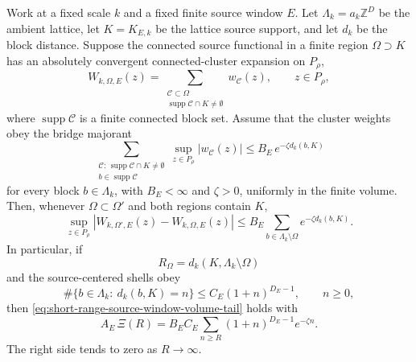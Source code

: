 \begin{lemma}
\label{lem:polymer-bridge-source-window-boundary-tail}
Work at a fixed scale \(k\) and a fixed finite source window \(E\).  Let
\(\Lambda_k=a_k\mathbb Z^D\) be the ambient lattice, let
\(K=K_{E,k}\) be the lattice source support, and let \(d_k\) be the block
distance.  Suppose the connected source functional in a finite region
\(\Omega\supset K\) has an absolutely convergent connected-cluster
expansion on \(P_\rho\),
\begin{equation}
  W_{k,\Omega,E}(z)
  =
  \sum_{\substack{\mathcal C\subset\Omega\\
    \operatorname{supp}\mathcal C\cap K\neq\emptyset}}
  w_{\mathcal C}(z),
  \qquad z\in P_\rho ,
  \label{eq:source-window-connected-cluster-expansion}
\end{equation}
where \(\operatorname{supp}\mathcal C\) is a finite connected block set.
Assume that the cluster weights obey the bridge majorant
\begin{equation}
  \sum_{\substack{\mathcal C:\,
    \operatorname{supp}\mathcal C\cap K\neq\emptyset\\
    b\in\operatorname{supp}\mathcal C}}
  \sup_{z\in P_\rho}|w_{\mathcal C}(z)|
  \leq
  B_E\,e^{-\zeta d_k(b,K)}
  \label{eq:source-window-polymer-bridge-majorant}
\end{equation}
for every block \(b\in\Lambda_k\), with \(B_E<\infty\) and
\(\zeta>0\), uniformly in the finite volume.  Then, whenever
\(\Omega\subset\Omega'\) and both regions contain \(K\),
\begin{equation}
  \sup_{z\in P_\rho}
  |W_{k,\Omega',E}(z)-W_{k,\Omega,E}(z)|
  \leq
  B_E
  \sum_{b\in\Lambda_k\setminus\Omega}
  e^{-\zeta d_k(b,K)} .
  \label{eq:source-window-polymer-bridge-boundary-sum}
\end{equation}
In particular, if
\[
  R_\Omega=d_k(K,\Lambda_k\setminus\Omega)
\]
and the source-centered shells obey
\[
  \#\{b\in\Lambda_k:\ d_k(b,K)=n\}
  \leq C_E(1+n)^{D_E-1},
  \qquad n\geq0 ,
\]
then \eqref{eq:short-range-source-window-volume-tail} holds with
\begin{equation}
  A_E\,\Xi(R)
  =
  B_E C_E
  \sum_{n\geq R}(1+n)^{D_E-1}e^{-\zeta n}.
  \label{eq:source-window-polymer-bridge-xi}
\end{equation}
The right side tends to zero as \(R\to\infty\).
\end{lemma}

